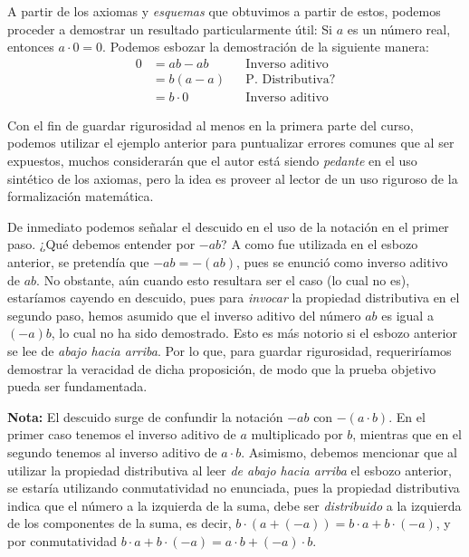 \documentclass[11pt]{article}
\begin{document}
A partir de los axiomas y \textit{esquemas} que obtuvimos a partir de estos, podemos proceder a demostrar un resultado particularmente útil: Si $a$ es un número real, entonces $a\cdot 0 = 0$. Podemos esbozar la demostración de la siguiente manera: \begin{align*}
    0 &= ab-ab && \text{Inverso aditivo}\\
    &= b(a-a) && \text{P. Distributiva?}\\
    &= b \cdot 0 && \text{Inverso aditivo}
\end{align*}

Con el fin de guardar rigurosidad al menos en la primera parte del curso, podemos utilizar el ejemplo anterior para puntualizar errores comunes que al ser expuestos, muchos considerarán que el autor está siendo \textit{pedante} en el uso sintético de los axiomas, pero la idea es proveer al lector de un uso riguroso de la formalización matemática.

De inmediato podemos señalar el descuido en el uso de la notación en el primer paso. ¿Qué debemos entender por $-ab$? A como fue utilizada en el esbozo anterior, se pretendía que $-ab=-(ab)$, pues se enunció como inverso aditivo de $ab$. No obstante, aún cuando esto resultara ser el caso (lo cual no es), estaríamos cayendo en descuido, pues para \textit{invocar} la propiedad distributiva en el segundo paso, hemos asumido que el inverso aditivo del número $ab$ es igual a $(-a)b$, lo cual no ha sido demostrado. Esto es más notorio si el esbozo anterior se lee de \textit{abajo hacia arriba}. Por lo que, para guardar rigurosidad, requeriríamos demostrar la veracidad de dicha proposición, de modo que la prueba objetivo pueda ser fundamentada.

\textbf{Nota:} El descuido surge de confundir la notación $-ab$ con $-(a\cdot b)$. En el primer caso tenemos el inverso aditivo de $a$ multiplicado por $b$, mientras que en el segundo tenemos al inverso aditivo de $a\cdot b$. Asimismo, debemos mencionar que al utilizar la propiedad distributiva al leer \textit{de abajo hacia arriba} el esbozo anterior, se estaría utilizando conmutatividad no enunciada, pues la propiedad distributiva indica que el número a la izquierda de la suma, debe ser \textit{distribuido} a la izquierda de los componentes de la suma, es decir, $b\cdot (a+(-a))=b\cdot a + b\cdot (-a)$, y por conmutatividad $b\cdot a + b\cdot (-a)=a\cdot b + (-a)\cdot b$.
\end{document}

